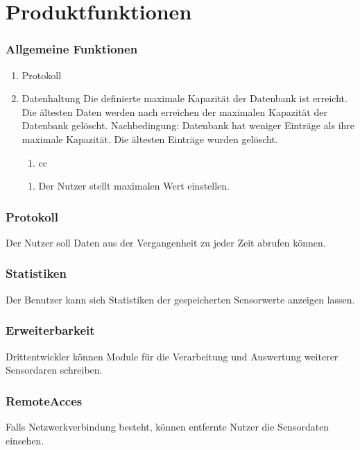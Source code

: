 \documentclass[pflichtenheft.tex]{subfiles}
\begin{document}
\chapter{Produktfunktionen}

\subsection{Allgemeine Funktionen}

\begin{enumerate}
	\item{Protokoll} 

	\item{Datenhaltung} Die definierte maximale Kapazität der Datenbank ist erreicht. Die ältesten Daten werden nach erreichen der maximalen Kapazität der Datenbank gelöscht.
	Nachbedingung: Datenbank hat weniger Einträge als ihre maximale Kapazität. Die ältesten Einträge wurden gelöscht.
	\begin{enumerate}
		\item cc
	\end{enumerate} 
	\begin{enumerate}
		\item Der Nutzer stellt maximalen Wert einstellen.
	\end{enumerate}

\end{enumerate}

\subsection{\mkfa Protokoll} Der Nutzer soll Daten aus der Vergangenheit zu jeder Zeit abrufen können.

\subsection{\mkfa Statistiken} Der Benutzer kann sich Statistiken der gespeicherten Sensorwerte anzeigen lassen.

\subsection{\mkfa Erweiterbarkeit} Drittentwickler können Module für die Verarbeitung und Auswertung weiterer Sensordaren schreiben.

\subsection{\mkfa RemoteAcces} Falls Netzwerkverbindung besteht, können entfernte Nutzer die Sensordaten einsehen.
\end{document}
